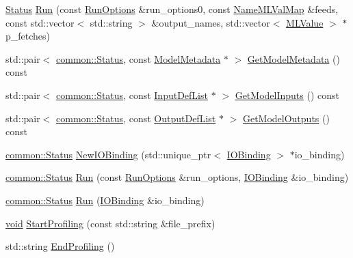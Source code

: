 \begin{DoxyCompactItemize}
\item 
\mbox{\hyperlink{classonnxruntime_1_1common_1_1Status}{Status}} \mbox{\hyperlink{classonnxruntime_1_1InferenceSession_1_1Impl_aa904ca4de813164cfb8bc0608498d9ae}{Run}} (const \mbox{\hyperlink{namespaceonnxruntime_a28ccb3d97f6827bf04d2ce259ff968f1}{Run\+Options}} \&run\+\_\+options0, const \mbox{\hyperlink{namespaceonnxruntime_a48b01f0410ec8d693dbd40d1132bd66c}{Name\+M\+L\+Val\+Map}} \&feeds, const std\+::vector$<$ std\+::string $>$ \&output\+\_\+names, std\+::vector$<$ \mbox{\hyperlink{classonnxruntime_1_1MLValue}{M\+L\+Value}} $>$ $\ast$p\+\_\+fetches)
\item 
std\+::pair$<$ \mbox{\hyperlink{classonnxruntime_1_1common_1_1Status}{common\+::\+Status}}, const \mbox{\hyperlink{structonnxruntime_1_1ModelMetadata}{Model\+Metadata}} $\ast$ $>$ \mbox{\hyperlink{classonnxruntime_1_1InferenceSession_1_1Impl_a34dba97aea4524d5d7e10aed1c645c77}{Get\+Model\+Metadata}} () const
\item 
std\+::pair$<$ \mbox{\hyperlink{classonnxruntime_1_1common_1_1Status}{common\+::\+Status}}, const \mbox{\hyperlink{namespaceonnxruntime_ab363b0109a9af018fb3e355aac00a360}{Input\+Def\+List}} $\ast$ $>$ \mbox{\hyperlink{classonnxruntime_1_1InferenceSession_1_1Impl_a4c410afb78ad0c06fc3e52145e83f7f8}{Get\+Model\+Inputs}} () const
\item 
std\+::pair$<$ \mbox{\hyperlink{classonnxruntime_1_1common_1_1Status}{common\+::\+Status}}, const \mbox{\hyperlink{namespaceonnxruntime_a4b3c292f33b95d038b5059f6103f287a}{Output\+Def\+List}} $\ast$ $>$ \mbox{\hyperlink{classonnxruntime_1_1InferenceSession_1_1Impl_ae05b7d6c367e31fb527dd807ddd92fb2}{Get\+Model\+Outputs}} () const
\item 
\mbox{\hyperlink{classonnxruntime_1_1common_1_1Status}{common\+::\+Status}} \mbox{\hyperlink{classonnxruntime_1_1InferenceSession_1_1Impl_a8650ce4e18b0a13a9e9f374d370ad8e5}{New\+I\+O\+Binding}} (std\+::unique\+\_\+ptr$<$ \mbox{\hyperlink{classonnxruntime_1_1IOBinding}{I\+O\+Binding}} $>$ $\ast$io\+\_\+binding)
\item 
\mbox{\hyperlink{classonnxruntime_1_1common_1_1Status}{common\+::\+Status}} \mbox{\hyperlink{classonnxruntime_1_1InferenceSession_1_1Impl_a8c0b0a42c5f4ba3a4fa6cffb730bb5f6}{Run}} (const \mbox{\hyperlink{namespaceonnxruntime_a28ccb3d97f6827bf04d2ce259ff968f1}{Run\+Options}} \&run\+\_\+options, \mbox{\hyperlink{classonnxruntime_1_1IOBinding}{I\+O\+Binding}} \&io\+\_\+binding)
\item 
\mbox{\hyperlink{classonnxruntime_1_1common_1_1Status}{common\+::\+Status}} \mbox{\hyperlink{classonnxruntime_1_1InferenceSession_1_1Impl_ac4b6faace4cc4ef595e2eba3486903f3}{Run}} (\mbox{\hyperlink{classonnxruntime_1_1IOBinding}{I\+O\+Binding}} \&io\+\_\+binding)
\item 
\mbox{\hyperlink{mlasi_8h_a88f941d423cb2a819b70a1358982b1a6}{void}} \mbox{\hyperlink{classonnxruntime_1_1InferenceSession_1_1Impl_aa6eca602c08e2c3c76aa6fadd05b9e22}{Start\+Profiling}} (const std\+::string \&file\+\_\+prefix)
\item 
std\+::string \mbox{\hyperlink{classonnxruntime_1_1InferenceSession_1_1Impl_af4994d40aa3ac98a6d7542a4c18d336b}{End\+Profiling}} ()
\end{DoxyCompactItemize}
